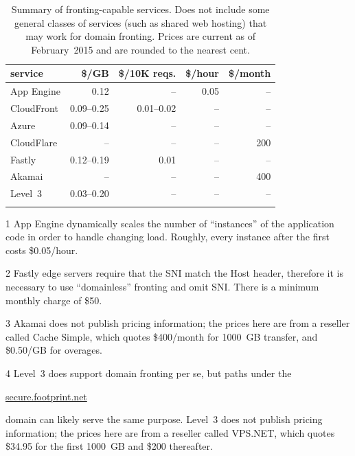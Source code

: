 \documentclass{sig-alternate}
\def\urll#1{\begin{NoHyper}\url{#1}\end{NoHyper}}
\begin{document}
\begin{table}
\centering
\begin{threeparttable}

\caption{
Summary of fronting-capable services.
Does not include some general classes of services (such as shared web hosting)
that may work for domain fronting.
Prices are current as of February~2015 and are
rounded to the nearest cent.
}
\label{tab:survey}

\begin{tabular*}{\linewidth}{l r r r r}
service             &        \$/GB & \$/10K reqs. & \$/hour & \$/month \\
\hline
App Engine\tnote{1} &       0.12 &              -- &    0.05 &       -- \\
CloudFront          & 0.09--0.25 &      0.01--0.02 &      -- &       -- \\
Azure               & 0.09--0.14 &              -- &      -- &       -- \\
CloudFlare          &         -- &              -- &      -- &      200 \\
Fastly\tnote{2}     & 0.12--0.19 &            0.01 &      -- &       -- \\
Akamai\tnote{3}     &         -- &              -- &      -- &      400 \\
Level~3\tnote{4}    & 0.03--0.20 &              -- &      -- &       -- \\
\noalign{\smallskip}
\end{tabular*}

\begin{tablenotes}
\item[1] App Engine dynamically scales the number of ``instances'' of the application code in order to handle changing load. Roughly, every instance after the first costs \$0.05/hour.
\item[2] Fastly edge servers require that the SNI match the Host header, therefore it is necessary to use ``domainless'' fronting and omit SNI. There is a minimum monthly charge of \$50.
\item[3] Akamai does not publish pricing information; the prices here are from a reseller called Cache Simple, which quotes \$400/month for 1000~GB transfer, and \$0.50/GB for overages.
\item[4] Level~3 does support domain fronting per se, but paths under the \urll{secure.footprint.net} domain can likely serve the same purpose. Level~3 does not publish pricing information; the prices here are from a reseller called VPS.NET, which quotes \$34.95 for the first 1000~GB and \$200 thereafter.
\end{tablenotes}

\end{threeparttable}
\end{table}
\end{document}
